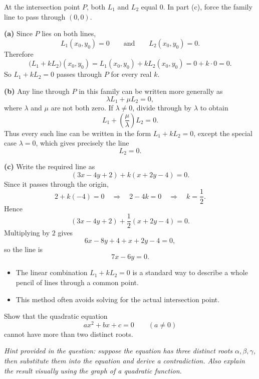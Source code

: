 \begin{hint}
At the intersection point $P$, both $L_1$ and $L_2$ equal $0$. In part (c), force the family line to pass through $(0,0)$.
\end{hint}

\begin{solution}
\textbf{(a)} Since $P$ lies on both lines,
\[
L_1(x_0,y_0)=0
\qquad \text{and} \qquad
L_2(x_0,y_0)=0.
\]
Therefore
\[
\bigl(L_1+kL_2\bigr)(x_0,y_0)=L_1(x_0,y_0)+kL_2(x_0,y_0)=0+k\cdot 0=0.
\]
So $L_1+kL_2=0$ passes through $P$ for every real $k$.

\textbf{(b)} Any line through $P$ in this family can be written more generally as
\[
\lambda L_1+\mu L_2=0,
\]
where $\lambda$ and $\mu$ are not both zero. If $\lambda\ne 0$, divide through by $\lambda$ to obtain
\[
L_1+\left(\frac{\mu}{\lambda}\right)L_2=0.
\]
Thus every such line can be written in the form $L_1+kL_2=0$, except the special case $\lambda=0$, which gives precisely the line
\[
L_2=0.
\]

\textbf{(c)} Write the required line as
\[
(3x-4y+2)+k(x+2y-4)=0.
\]
Since it passes through the origin,
\[
2+k(-4)=0
\quad\Longrightarrow\quad
2-4k=0
\quad\Longrightarrow\quad
k=\frac12.
\]
Hence
\[
(3x-4y+2)+\frac12(x+2y-4)=0.
\]
Multiplying by $2$ gives
\[
6x-8y+4+x+2y-4=0,
\]
so the line is
\[
\boxed{7x-6y=0.}
\]
\end{solution}

\begin{takeaways}
\begin{itemize}[leftmargin=*]
\item The linear combination $L_1+kL_2=0$ is a standard way to describe a whole pencil of lines through a common point.
\item This method often avoids solving for the actual intersection point.
\end{itemize}
\end{takeaways}

\begin{problem}
Show that the quadratic equation
\[
ax^2+bx+c=0
\qquad (a\ne 0)
\]
cannot have more than two distinct roots.

\textit{Hint provided in the question: suppose the equation has three distinct roots $\alpha,\beta,\gamma$, then substitute them into the equation and derive a contradiction. Also explain the result visually using the graph of a quadratic function.}
\end{problem}

